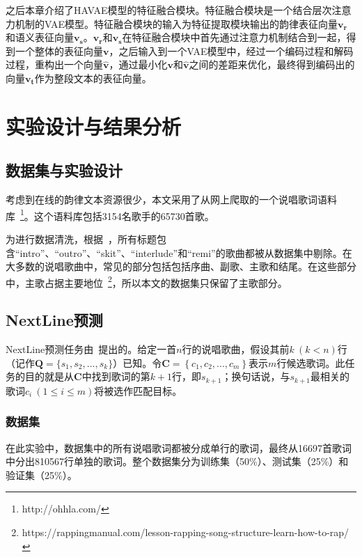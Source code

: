 之后本章介绍了HAVAE模型的特征融合模块。特征融合模块是一个结合层次注意力机制的VAE模型。特征融合模块的输入为特征提取模块输出的韵律表征向量$\bm {v_r}$和语义表征向量$\bm{v_s}$。$\bm {v_r}$和$\bm{v_s}$在特征融合模块中首先通过注意力机制结合到一起，得到一个整体的表征向量$\bm {v}$，之后输入到一个VAE模型中，经过一个编码过程和解码过程，重构出一个向量$\bm {\hat v}$，通过最小化$\bm {v}$和$\bm {\hat v}$之间的差距来优化，最终得到编码出的向量$\bm{v_t}$作为整段文本的表征向量。\par

\chapter{实验设计与结果分析} \label{chpt:exp}

\section{数据集与实验设计}
考虑到在线的韵律文本资源很少，本文采用了从网上爬取的一个说唱歌词语料库~\footnote{http://ohhla.com/}。这个语料库包括3154名歌手的65730首歌。\par

\begin{sloppypar}
为进行数据清洗，根据~\autocite{Malmi2016dopelearning}，所有标题包含“intro”、“outro”、“skit”、“interlude”和“remi”的歌曲都被从数据集中剔除。在大多数的说唱歌曲中，常见的部分包括包括序曲、副歌、主歌和结尾。在这些部分中，主歌占据主要地位~\footnote{https://rappingmanual.com/lesson-rapping-song-structure-learn-how-to-rap/}，所以本文的数据集只保留了主歌部分。\par
\end{sloppypar}

\section{NextLine预测} \label{sec:nextline}
NextLine预测任务由~\autocite{Malmi2016dopelearning}提出的。给定一首$n$行的说唱歌曲，假设其前$k~(k<n)$行（记作$\bm Q=\{s_1,s_2,...,s_k\}$）已知。令$\bm C={\left\{c_1,c_2,...,c_m\right\}}$表示$m$行候选歌词。此任务的目的就是从$\bm C $中找到歌词的第$k+1$行，即$s_{k+1}$；换句话说，与$s_{k+1}$最相关的歌词$c_i~(1\leq i \leq m)$将被选作匹配目标。\par

\subsection{数据集} \label{subsec:nextdata}
在此实验中，数据集中的所有说唱歌词都被分成单行的歌词，最终从16697首歌词中分出810567行单独的歌词。整个数据集分为训练集（50\%）、测试集（25\%）和验证集（25\%）。\par

